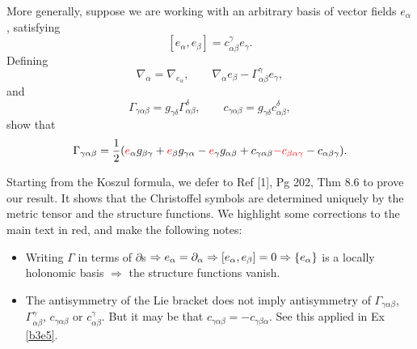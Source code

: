 \documentclass[10pt]{article}
\begin{document}
\begin{example}\label{b3e4}
	More generally, suppose we are working with an arbitrary basis of vector fields $e_\alpha$, satisfying
	$$
	[e_\alpha,e_\beta]=c_{\alpha\beta}^\gamma e_\gamma.
	$$
	Defining
	$$
	\nabla_\alpha=\nabla_{e_\alpha},\qquad\nabla_\alpha e_\beta-\Gamma_{\alpha\beta}^\gamma e_\gamma,
	$$
	and
	$$
	\Gamma_{\gamma\alpha\beta}=g_{\gamma\delta}\Gamma_{\alpha\beta}^\delta,\qquad c_{\gamma\alpha\beta}=g_{\gamma\delta}c_{\alpha\beta}^\delta,
	$$
	show that
	$$
	\Gamma_{\gamma\alpha\beta}=\frac12({\color{red}e}_\alpha g_{\beta\gamma}+{\color{red}e}_\beta g_{\gamma\alpha}-{\color{red}e}_\gamma g_{\alpha\beta}+c_{\gamma\alpha\beta}{\color{red}-c_{\beta\alpha\gamma}}-c_{\alpha\beta\gamma}).
	$$
\end{example}
\sol Starting from the Koszul formula, we defer to Ref [1], Pg 202, Thm 8.6 to prove our result. It shows that the Christoffel symbols are determined uniquely by the metric tensor and the structure functions. We highlight some corrections to the main text in {\color{red}red}, and make the following notes:
\begin{itemize}
	\item Writing $\Gamma$ in terms of $\partial$s $\Rightarrow e_\alpha = \partial_\alpha \Rightarrow [e_\alpha,e_\beta]=0 \Rightarrow \lbrace e_\alpha\rbrace$ is a locally holonomic basis $\Rightarrow$ the structure functions vanish.
	\item The antisymmetry of the Lie bracket does not imply antisymmetry of $\Gamma_{\gamma\alpha\beta}$, $\Gamma_{\alpha\beta}^\gamma$, $c_{\gamma\alpha\beta}$ or $c_{\alpha\beta}^\gamma$. But it may be that $c_{\gamma\alpha\beta} = -c_{\gamma\beta\alpha}$. See this applied in Ex \ref{b3e5}.
\end{itemize}
\end{document}
